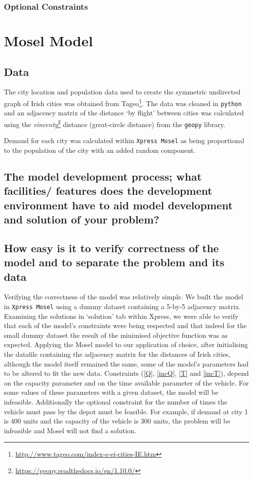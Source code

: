 \documentclass[a4paper,11pt]{article}
\begin{document}
\subsubsection{Optional Constraints}


\section{Mosel Model}

\subsection{Data}

The city location and population data used to create the symmetric undirected graph of Irish cities was obtained from Tageo\footnote{\url{http://www.tageo.com/index-e-ei-cities-IE.htm}}. The data was cleaned in \texttt{python} and an adjacency matrix of the distance `by flight' between cities was calculated using the \textit{vincenty}\footnote{\url{https://geopy.readthedocs.io/en/1.10.0/}} distance (great-circle distance) from the \texttt{geopy} library.

Demand for each city was calculated within \texttt{Xpress Mosel} as being proportional to the population of the city with an added random component.

\subsection{The model development process; what facilities/ features does the development environment
have to aid model development and solution of your problem? }




\subsection{How easy is it to verify correctness of the model and to separate the problem and its data}
Verifying the correctness of the model was relatively simple. We built the model in \texttt{Xpress Mosel} using a dummy dataset containing a 5-by-5 adjacency matrix. Examining the solutions in `solution' tab within Xpress, we were able to verify that each of the model's constraints were being respected and that indeed for the small dummy dataset the result of the minimised objective function was as expected. Applying the Mosel model to our application of choice, after initialising the datafile containing the adjacency matrix for the distances of Irish cities, although the model itself remained the same, some of the model's parameters had to be altered to fit the new data. Constraints (\ref{Q}, \ref{incQ}, \ref{T} and \ref{incT}), depend on the capacity parameter and on the time available parameter of the vehicle. For some values of these parameters with a given dataset, the model will be infeasible. Additionally the optional constraint for the number of times the vehicle must pass by the depot must be feasible. For example, if demand at city 1 is 400 units and the capacity of the vehicle is 300 units, the problem will be infeasible and Mosel will not find a solution.
\end{document}
